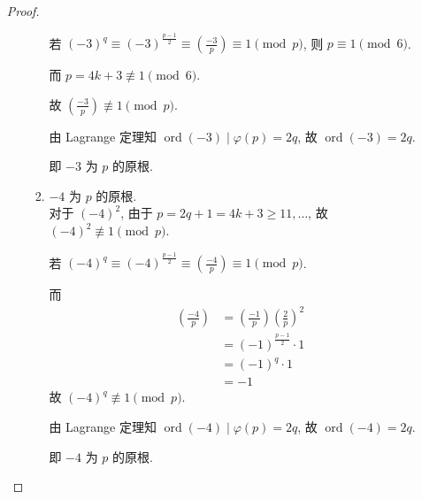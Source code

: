\begin{enumerate}
\begin{proof}
\begin{enumerate}
\begin{enumerate}
            若 $(-3)^q \equiv (-3)^{\frac{p-1}{2}} \equiv \left(\frac{-3}{p}\right) \equiv 1 \pmod p$,
            则 $p \equiv 1 \pmod 6$.
            
            而 $p = 4k+3 \not\equiv 1 \pmod 6$.
            
            故 $\left(\frac{-3}{p}\right) \not\equiv 1 \pmod p$. %
            
            由 Lagrange 定理知 $\operatorname{ord}(-3) \mid \varphi(p)=2q$, 故 $\operatorname{ord}(-3)=2q$.
            
            即 $-3$ 为 $p$ 的原根.
            \item $-4$ 为 $p$ 的原根. \\
            对于 $(-4)^2$, 由于 $p=2q+1 = 4k+3 \ge 11, \dots$, 故 $(-4)^2 \not\equiv 1 \pmod p$.
            
            若 $(-4)^q \equiv (-4)^{\frac{p-1}{2}} \equiv \left(\frac{-4}{p}\right) \equiv 1 \pmod p$.
            
            而
            \begin{align*}
                \left(\frac{-4}{p}\right) &= \left(\frac{-1}{p}\right) \left(\frac{2}{p}\right)^2 \\ %
                                      &= (-1)^{\frac{p-1}{2}} \cdot 1 \\
                                      &= (-1)^q \cdot 1 \\
                                      &= -1
            \end{align*}
            故 $(-4)^q \not\equiv 1 \pmod p$.
            
            由 Lagrange 定理知 $\operatorname{ord}(-4) \mid \varphi(p)=2q$, 故 $\operatorname{ord}(-4)=2q$.
            
            即 $-4$ 为 $p$ 的原根.
        \end{enumerate}
    \end{enumerate}
\end{proof}
\end{enumerate}